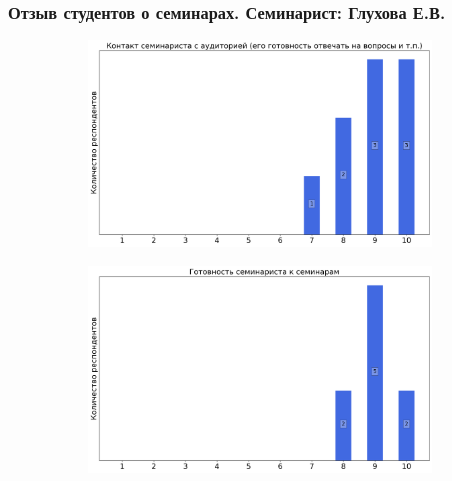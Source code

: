     \subsubsection{Отзыв студентов о семинарах. Семинарист: Глухова Е.В.}
        \begin{figure}[H]
            \centering
            \begin{subfigure}[b]{0.45\textwidth}
                \centering
                \includegraphics[width=\textwidth]{images/1 course/Аналитическая геометрия/seminarists-marks-Глухова Е.В.-0.png}
            \end{subfigure}
            \begin{subfigure}[b]{0.45\textwidth}
                \centering
                \includegraphics[width=\textwidth]{images/1 course/Аналитическая геометрия/seminarists-marks-Глухова Е.В.-1.png}
            \end{subfigure}
            \begin{subfigure}[b]{0.45\textwidth}
                \centering

\end{subfigure}
\end{figure}
